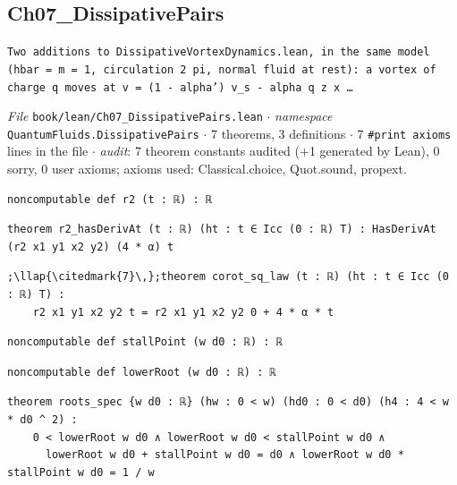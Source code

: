 \subsection{Ch07\_\allowbreak{}DissipativePairs}
{\footnotesize\raggedright\texttt{Two additions to DissipativeVortexDynamics.\allowbreak{}lean,\allowbreak{} in the same model (hbar = m = 1,\allowbreak{} circulation 2 pi,\allowbreak{} normal fluid at rest): a vortex of charge q moves at   v = (1 -\allowbreak{} alpha') v\_\allowbreak{}s -\allowbreak{} alpha q z x …}\par}
{\footnotesize\raggedright\emph{File} \texttt{book/lean/Ch07\_\allowbreak{}DissipativePairs.\allowbreak{}lean} $\cdot$ \emph{namespace} \texttt{QuantumFluids.\allowbreak{}DissipativePairs} $\cdot$ 7 theorems, 3 definitions $\cdot$ 7 \texttt{\#print axioms} lines in the file $\cdot$ \emph{audit}: 7 theorem constants audited (+1 generated by Lean), 0 sorry, 0 user axioms; axioms used: Classical.choice, Quot.sound, propext.\par}
\begin{lstlisting}[style=leancat]
noncomputable def r2 (t : ℝ) : ℝ
\end{lstlisting}

\begin{lstlisting}[style=leancat]
theorem r2_hasDerivAt (t : ℝ) (ht : t ∈ Icc (0 : ℝ) T) : HasDerivAt (r2 x1 y1 x2 y2) (4 * α) t
\end{lstlisting}

\begin{lstlisting}[style=leancat]
;\llap{\citedmark{7}\,};theorem corot_sq_law (t : ℝ) (ht : t ∈ Icc (0 : ℝ) T) :
    r2 x1 y1 x2 y2 t = r2 x1 y1 x2 y2 0 + 4 * α * t
\end{lstlisting}

\begin{lstlisting}[style=leancat]
noncomputable def stallPoint (w d0 : ℝ) : ℝ
\end{lstlisting}

\begin{lstlisting}[style=leancat]
noncomputable def lowerRoot (w d0 : ℝ) : ℝ
\end{lstlisting}

\begin{lstlisting}[style=leancat]
theorem roots_spec {w d0 : ℝ} (hw : 0 < w) (hd0 : 0 < d0) (h4 : 4 < w * d0 ^ 2) :
    0 < lowerRoot w d0 ∧ lowerRoot w d0 < stallPoint w d0 ∧
      lowerRoot w d0 + stallPoint w d0 = d0 ∧ lowerRoot w d0 * stallPoint w d0 = 1 / w
\end{lstlisting}

